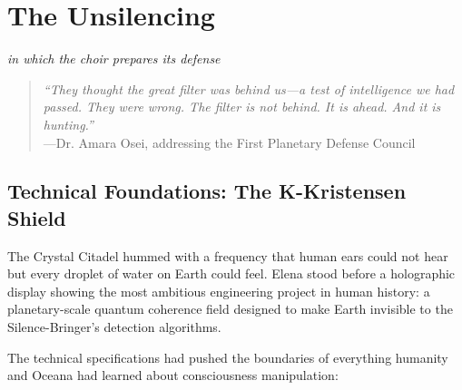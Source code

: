 \chapter{The Unsilencing}
\textit{in which the choir prepares its defense}

\begin{quote}
\textit{``They thought the great filter was behind us—a test of intelligence we had passed. They were wrong. The filter is not behind. It is ahead. And it is hunting.''} \\
---Dr. Amara Osei, addressing the First Planetary Defense Council
\end{quote}

\section{Technical Foundations: The K-Kristensen Shield}

The Crystal Citadel hummed with a frequency that human ears could not hear but every droplet of water on Earth could feel. Elena stood before a holographic display showing the most ambitious engineering project in human history: a planetary-scale quantum coherence field designed to make Earth invisible to the Silence-Bringer's detection algorithms.

The technical specifications had pushed the boundaries of everything humanity and Oceana had learned about consciousness manipulation:

